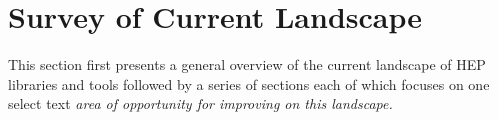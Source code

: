 \section{Survey of Current Landscape}

This section first presents a general overview of the current landscape of HEP libraries and tools followed by a series of sections each of which focuses on one select text \it{area of opportunity} for improving on this landscape. 











